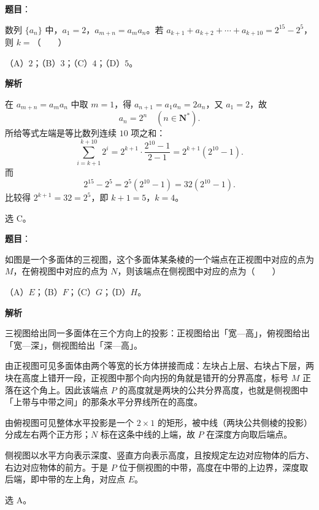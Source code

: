 \begin{answer}

\textbf{题目}：

数列 $\{a_n\}$ 中，$a_1=2$，$a_{m+n}=a_ma_n$。若 $a_{k+1}+a_{k+2}+\cdots+a_{k+10}=2^{15}-2^5$，则 $k=$\mbox{（　　）}

（A）$2$；（B）$3$；（C）$4$；（D）$5$。

\textbf{解析}

在 $a_{m+n}=a_ma_n$ 中取 $m=1$，得 $a_{n+1}=a_1a_n=2a_n$，又 $a_1=2$，故
\nopagebreak[4]
\[a_n=2^n\quad(n\in\mathbf N^*).\]
所给等式左端是等比数列连续 $10$ 项之和：
\nopagebreak[4]
\[\sum_{i=k+1}^{k+10}2^i=2^{k+1}\cdot\frac{2^{10}-1}{2-1}=2^{k+1}(2^{10}-1).\]
而
\nopagebreak[4]
\[2^{15}-2^5=2^5(2^{10}-1)=32(2^{10}-1).\]
比较得 $2^{k+1}=32=2^5$，即 $k+1=5$，$k=4$。

选 C。


\end{answer}
\begin{answer}

\textbf{题目}：

如图是一个多面体的三视图，这个多面体某条棱的一个端点在正视图中对应的点为 $M$，在俯视图中对应的点为 $N$，则该端点在侧视图中对应的点为\mbox{（　　）}

（A）$E$；（B）$F$；（C）$G$；（D）$H$。
\nopagebreak[4]
\begin{center}\end{center}
\nopagebreak[4]
\textbf{解析}

三视图给出同一多面体在三个方向上的投影：正视图给出「宽—高」，俯视图给出「宽—深」，侧视图给出「深—高」。

由正视图可见多面体由两个等宽的长方体拼接而成：左块占上层、右块占下层，两块在高度上错开一段，正视图中那个向内拐的角就是错开的分界高度，标号 $M$ 正落在这个角上。因此该端点 $P$ 的高度就是两块的公共分界高度，也就是侧视图中「上带与中带之间」的那条水平分界线所在的高度。

由俯视图可见整体水平投影是一个 $2\times1$ 的矩形，被中线（两块公共侧棱的投影）分成左右两个正方形；$N$ 标在这条中线的上端，故 $P$ 在深度方向取后端点。

侧视图以水平方向表示深度、竖直方向表示高度，且按规定左边对应物体的后方、右边对应物体的前方。于是 $P$ 位于侧视图的中带，高度在中带的上边界，深度取后端，即中带的左上角，对应点 $E$。

选 A。


\end{answer}
